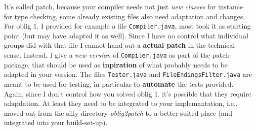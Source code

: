 \documentclass[11pt,freeform]{handout}[2014/08/13]
\begin{document}
It's called patch, because your compiler needs not just \emph{new classes}
for instance for type checking, some already existing files also need
adaptation and changes. For oblig 1, I provided for example a file
\texttt{Compiler.java}, most took it as starting point (but may have
adapted it as well). Since I have no control what individual groups did
with that file I cannot hand out a \textbf{actual patch} in the technical
sense. Instead, I give a \emph{new version} of \texttt{Compiler.java} as
part of the patch-package, that should be used as \textbf{inpiration} of
what probably needs to be adapted in your version. The files
\texttt{Tester.java} and \texttt{FileEndingsFilter.java} are meant to be
used for testing, in particular to \textbf{automate} the tests
provided. Again, since I don't control how you solved oblig 1, it's
possible that they require adapdation. At least they need to be integrated
to your implemantation, i.e., moved out from the silly directory
\emph{oblig2patch} to a better suited place (and integrated into your
build-set-up).









%
% 




\end{document}
